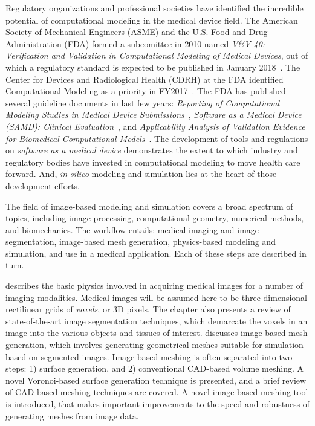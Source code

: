 Regulatory organizations and professional societies have identified the incredible potential of computational modeling in the medical device field. The American Society of Mechanical Engineers (ASME) and the U.S. Food and Drug Administration (FDA) formed a subcomittee in 2010 named \textit{V\&V 40: Verification and Validation in Computational Modeling of Medical Devices}, out of which a regulatory standard is expected to be published in January 2018~\cite{committee}. The Center for Devices and Radiological Health (CDRH) at the FDA identified Computational Modeling as a priority in FY2017~\cite{Morrison2017}. The FDA has published several guideline documents in last few years: \textit{Reporting of Computational Modeling Studies in Medical Device Submissions}~\cite{fda1_2016}, \textit{Software as a Medical Device (SAMD): Clinical Evaluation}~\cite{fda1_2016}, and \textit{Applicability Analysis of Validation Evidence for Biomedical Computational Models}~\cite{pathmanathan_2017}. The development of tools and regulations on \textit{software as a medical device} demonstrates the extent to which industry and regulatory bodies have invested in computational modeling to move health care forward. And, \textit{in silico} modeling and simulation lies at the heart of those development efforts.


The field of image-based modeling and simulation covers a broad spectrum of topics, including image processing, computational geometry, numerical methods, and biomechanics. The workflow entails: medical imaging and image segmentation, image-based mesh generation, physics-based modeling and simulation, and use in a medical application. Each of these steps are described in turn.

 describes the basic physics involved in acquiring medical images for a number of imaging modalities. Medical images will be assumed here to be three-dimensional rectilinear grids of \textit{voxels}, or 3D pixels. The chapter also presents a review of state-of-the-art image segmentation techniques, which demarcate the voxels in an image into the various objects and tissues of interest.  discusses image-based mesh generation, which involves generating geometrical meshes suitable for simulation based on segmented images. Image-based meshing is often separated into two steps: 1) surface generation,  and 2) conventional CAD-based volume meshing. A novel Voronoi-based surface generation technique is presented, and a brief review of CAD-based meshing techniques are covered. A novel image-based meshing tool is introduced, that makes important improvements to the speed and robustness of generating meshes from image data.

